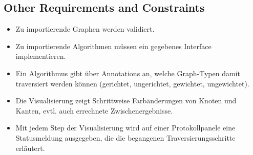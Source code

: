 \subsection{Other Requirements and Constraints}	
\label{subsec:Other Requirements and Constraints}
\begin{itemize}
  \item Zu importierende Graphen werden validiert.
  \item Zu importierende Algorithmen m\"ussen ein gegebenes Interface implementieren.
  \item Ein Algorithmus gibt \"uber Annotations an, welche Graph-Typen damit traversiert werden k\"onnen (gerichtet, ungerichtet, gewichtet, ungewichtet).
  \item Die Visualisierung zeigt Schrittweise Farb\"anderungen von Knoten und Kanten, evtl. auch errechnete Zwischenergebnisse.
  \item Mit jedem Step der Visualisierung wird auf einer Protokollpanele eine Statusmeldung ausgegeben, die die begangenen Traversierungsschritte erl\"autert.
\end{itemize}